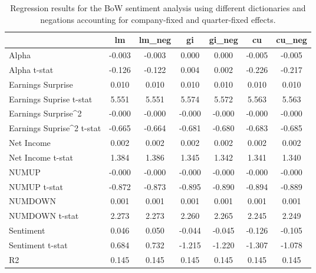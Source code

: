 \begin{table}
\caption{Regression results for the BoW sentiment analysis using different dictionaries and negations accounting for company-fixed and quarter-fixed effects.}
\label{tab:bow_regressions_company_and_quarter_fixed}
\begin{tabular}{lcccccc}
\toprule
 & lm & lm_neg & gi & gi_neg & cu & cu_neg \\
\midrule
Alpha & -0.003 & -0.003 & 0.000 & 0.000 & -0.005 & -0.005 \\
Alpha t-stat & -0.126 & -0.122 & 0.004 & 0.002 & -0.226 & -0.217 \\
Earnings Surprise & 0.010 & 0.010 & 0.010 & 0.010 & 0.010 & 0.010 \\
Earnings Suprise t-stat & 5.551 & 5.551 & 5.574 & 5.572 & 5.563 & 5.563 \\
Earnings Surprise^2 & -0.000 & -0.000 & -0.000 & -0.000 & -0.000 & -0.000 \\
Earnings Suprise^2 t-stat & -0.665 & -0.664 & -0.681 & -0.680 & -0.683 & -0.685 \\
Net Income & 0.002 & 0.002 & 0.002 & 0.002 & 0.002 & 0.002 \\
Net Income t-stat & 1.384 & 1.386 & 1.345 & 1.342 & 1.341 & 1.340 \\
NUMUP & -0.000 & -0.000 & -0.000 & -0.000 & -0.000 & -0.000 \\
NUMUP t-stat & -0.872 & -0.873 & -0.895 & -0.890 & -0.894 & -0.889 \\
NUMDOWN & 0.001 & 0.001 & 0.001 & 0.001 & 0.001 & 0.001 \\
NUMDOWN t-stat & 2.273 & 2.273 & 2.260 & 2.265 & 2.245 & 2.249 \\
Sentiment & 0.046 & 0.050 & -0.044 & -0.045 & -0.126 & -0.105 \\
Sentiment t-stat & 0.684 & 0.732 & -1.215 & -1.220 & -1.307 & -1.078 \\
R2 & 0.145 & 0.145 & 0.145 & 0.145 & 0.145 & 0.145 \\
\bottomrule
\end{tabular}
\end{table}
